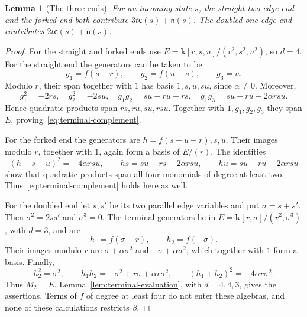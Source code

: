 \documentclass[reqno]{article}
\theoremstyle{plain} %
\newtheorem{lemma}[theorem]{Lemma}
\theoremstyle{definition}
\theoremstyle{remark}
\newcommand{\K} {\mathbf{k}}
\numberwithin{equation}{section}
\begin{document}
\begin{lemma}[The three ends]
\label{lem:three-ends}
For an incoming state \(s\), the straight two-edge end and the forked
end both contribute \(3t\mathsf c(s)+\mathsf n(s)\). The doubled
one-edge end contributes \(2t\mathsf c(s)+\mathsf n(s)\).
\end{lemma}

\begin{proof}
For the straight and forked ends use
\(E=\K[r,s,u]/(r^2,s^2,u^2)\), so \(d=4\).
For the straight end the generators can be taken to be
\[
g_1=f(s-r),\qquad g_2=f(u-s),\qquad g_3=u.
\]
Modulo \(r\), their span together with \(1\) has basis
\(1,s,u,su\), since \(\alpha\ne0\). Moreover,
\[
g_1^2=-2rs,\quad g_2^2=-2su,\quad
g_1g_2=su-ru+rs,\quad g_1g_3=su-ru-2\alpha rsu.
\]
Hence quadratic products span \(rs,ru,su,rsu\). Together with
\(1,g_1,g_2,g_3\) they span \(E\), proving~\eqref{eq:terminal-complement}.

For the forked end the generators are \(h=f(s+u-r),s,u\). Their
images modulo \(r\), together with \(1\), again form a basis of
\(E/(r)\). The identities
\[
(h-s-u)^2=-4\alpha rsu,\qquad
hs=su-rs-2\alpha rsu,\qquad
hu=su-ru-2\alpha rsu
\]
show that quadratic products span all four monomials of degree at least
two. Thus~\eqref{eq:terminal-complement} holds here as well.

For the doubled end let \(s,s'\) be its two parallel edge variables and
put \(\sigma=s+s'\). Then \(\sigma^2=2ss'\) and \(\sigma^3=0\).
The terminal generators lie in
\(E=\K[r,\sigma]/(r^2,\sigma^3)\), with \(d=3\), and are
\[
h_1=f(\sigma-r),\qquad h_2=f(-\sigma).
\]
Their images modulo \(r\) are \(\sigma+\alpha\sigma^2\) and
\(-\sigma+\alpha\sigma^2\), which together with \(1\) form a
basis. Finally,
\[
h_2^2=\sigma^2,\qquad
h_1h_2=-\sigma^2+r\sigma+\alpha r\sigma^2,\qquad
(h_1+h_2)^2=-4\alpha r\sigma^2.
\]
Thus \(M_2=E\). Lemma~\ref{lem:terminal-evaluation}, with
\(d=4,4,3\), gives the assertions. Terms of \(f\) of degree at least four do not
enter these algebras, and none of these calculations restricts \(\beta\).
\end{proof}
\end{document}
